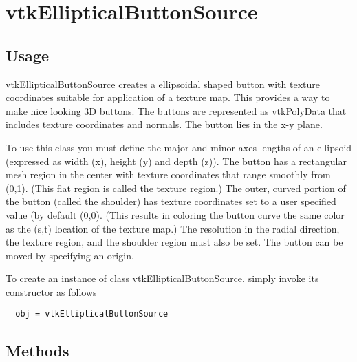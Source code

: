 \section{vtkEllipticalButtonSource}

\subsection{Usage}

 vtkEllipticalButtonSource creates a ellipsoidal shaped button with
 texture coordinates suitable for application of a texture map. This
 provides a way to make nice looking 3D buttons. The buttons are
 represented as vtkPolyData that includes texture coordinates and
 normals. The button lies in the x-y plane.

 To use this class you must define the major and minor axes lengths of an
 ellipsoid (expressed as width (x), height (y) and depth (z)). The button
 has a rectangular mesh region in the center with texture coordinates that
 range smoothly from (0,1). (This flat region is called the texture
 region.) The outer, curved portion of the button (called the shoulder) has
 texture coordinates set to a user specified value (by default (0,0).
 (This results in coloring the button curve the same color as the (s,t)
 location of the texture map.) The resolution in the radial direction, the
 texture region, and the shoulder region must also be set. The button can
 be moved by specifying an origin.


To create an instance of class vtkEllipticalButtonSource, simply
invoke its constructor as follows
\begin{verbatim}
  obj = vtkEllipticalButtonSource
\end{verbatim}
\subsection{Methods}

